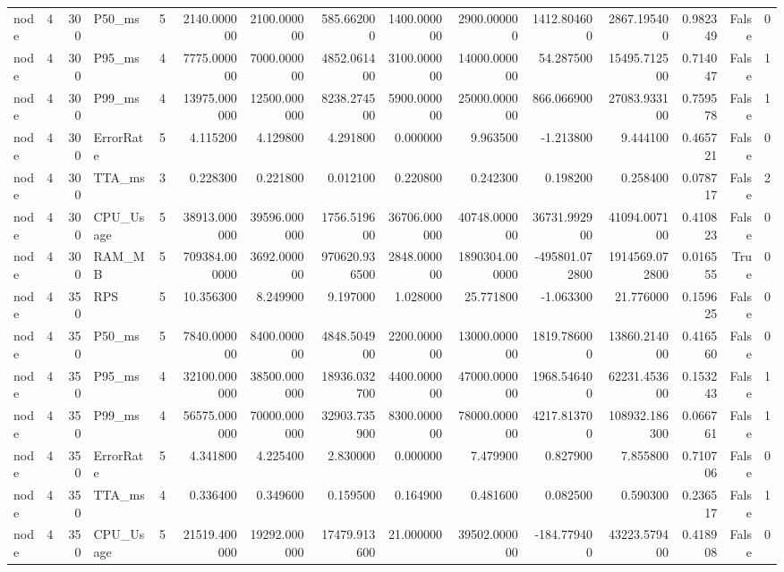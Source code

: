 \begin{tabular}{lrrlrrrrrrrrrrr}
node & 4 & 300 & P50_ms & 5 & 2140.000000 & 2100.000000 & 585.662000 & 1400.000000 & 2900.000000 & 1412.804600 & 2867.195400 & 0.982349 & False & 0 \\
node & 4 & 300 & P95_ms & 4 & 7775.000000 & 7000.000000 & 4852.061400 & 3100.000000 & 14000.000000 & 54.287500 & 15495.712500 & 0.714047 & False & 1 \\
node & 4 & 300 & P99_ms & 4 & 13975.000000 & 12500.000000 & 8238.274500 & 5900.000000 & 25000.000000 & 866.066900 & 27083.933100 & 0.759578 & False & 1 \\
node & 4 & 300 & ErrorRate & 5 & 4.115200 & 4.129800 & 4.291800 & 0.000000 & 9.963500 & -1.213800 & 9.444100 & 0.465721 & False & 0 \\
node & 4 & 300 & TTA_ms & 3 & 0.228300 & 0.221800 & 0.012100 & 0.220800 & 0.242300 & 0.198200 & 0.258400 & 0.078717 & False & 2 \\
node & 4 & 300 & CPU_Usage & 5 & 38913.000000 & 39596.000000 & 1756.519600 & 36706.000000 & 40748.000000 & 36731.992900 & 41094.007100 & 0.410823 & False & 0 \\
node & 4 & 300 & RAM_MB & 5 & 709384.000000 & 3692.000000 & 970620.936500 & 2848.000000 & 1890304.000000 & -495801.072800 & 1914569.072800 & 0.016555 & True & 0 \\
node & 4 & 350 & RPS & 5 & 10.356300 & 8.249900 & 9.197000 & 1.028000 & 25.771800 & -1.063300 & 21.776000 & 0.159625 & False & 0 \\
node & 4 & 350 & P50_ms & 5 & 7840.000000 & 8400.000000 & 4848.504900 & 2200.000000 & 13000.000000 & 1819.786000 & 13860.214000 & 0.416560 & False & 0 \\
node & 4 & 350 & P95_ms & 4 & 32100.000000 & 38500.000000 & 18936.032700 & 4400.000000 & 47000.000000 & 1968.546400 & 62231.453600 & 0.153243 & False & 1 \\
node & 4 & 350 & P99_ms & 4 & 56575.000000 & 70000.000000 & 32903.735900 & 8300.000000 & 78000.000000 & 4217.813700 & 108932.186300 & 0.066761 & False & 1 \\
node & 4 & 350 & ErrorRate & 5 & 4.341800 & 4.225400 & 2.830000 & 0.000000 & 7.479900 & 0.827900 & 7.855800 & 0.710706 & False & 0 \\
node & 4 & 350 & TTA_ms & 4 & 0.336400 & 0.349600 & 0.159500 & 0.164900 & 0.481600 & 0.082500 & 0.590300 & 0.236517 & False & 1 \\
node & 4 & 350 & CPU_Usage & 5 & 21519.400000 & 19292.000000 & 17479.913600 & 21.000000 & 39502.000000 & -184.779400 & 43223.579400 & 0.418908 & False & 0 \\

\end{tabular}
